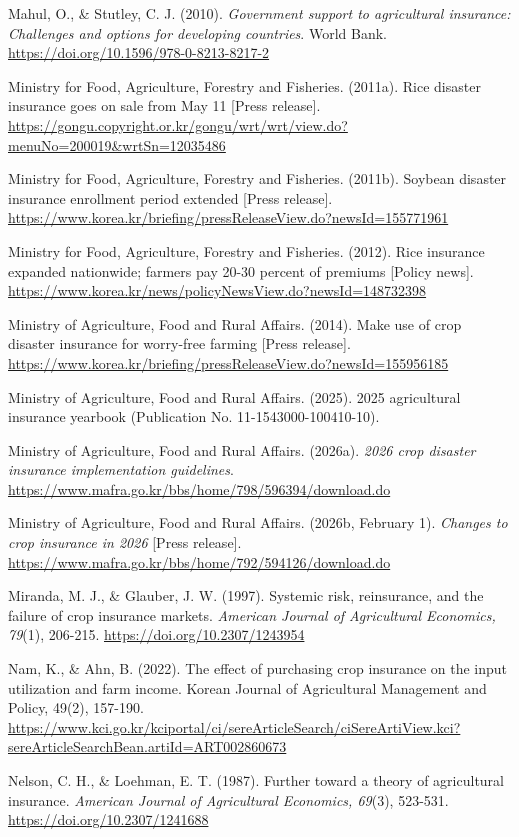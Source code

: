 \begin{wordreferences}
Mahul, O., \& Stutley, C. J. (2010). \emph{Government support to agricultural insurance: Challenges and options for developing countries}. World Bank. \url{https://doi.org/10.1596/978-0-8213-8217-2}

Ministry for Food, Agriculture, Forestry and Fisheries. (2011a). Rice disaster insurance goes on sale from May 11 [Press release]. \url{https://gongu.copyright.or.kr/gongu/wrt/wrt/view.do?menuNo=200019&wrtSn=12035486}

Ministry for Food, Agriculture, Forestry and Fisheries. (2011b). Soybean disaster insurance enrollment period extended [Press release]. \url{https://www.korea.kr/briefing/pressReleaseView.do?newsId=155771961}

Ministry for Food, Agriculture, Forestry and Fisheries. (2012). Rice insurance expanded nationwide; farmers pay 20-30 percent of premiums [Policy news]. \url{https://www.korea.kr/news/policyNewsView.do?newsId=148732398}

Ministry of Agriculture, Food and Rural Affairs. (2014). Make use of crop disaster insurance for worry-free farming [Press release]. \url{https://www.korea.kr/briefing/pressReleaseView.do?newsId=155956185}

Ministry of Agriculture, Food and Rural Affairs. (2025). 2025 agricultural insurance yearbook (Publication No. 11-1543000-100410-10).

Ministry of Agriculture, Food and Rural Affairs. (2026a). \emph{2026 crop disaster insurance implementation guidelines}. \url{https://www.mafra.go.kr/bbs/home/798/596394/download.do}

Ministry of Agriculture, Food and Rural Affairs. (2026b, February 1). \emph{Changes to crop insurance in 2026} [Press release]. \url{https://www.mafra.go.kr/bbs/home/792/594126/download.do}

Miranda, M. J., \& Glauber, J. W. (1997). Systemic risk, reinsurance, and the failure of crop insurance markets. \emph{American Journal of Agricultural Economics, 79}(1), 206-215. \url{https://doi.org/10.2307/1243954}

Nam, K., \& Ahn, B. (2022). The effect of purchasing crop insurance on the input utilization and farm income. Korean Journal of Agricultural Management and Policy, 49(2), 157-190. \url{https://www.kci.go.kr/kciportal/ci/sereArticleSearch/ciSereArtiView.kci?sereArticleSearchBean.artiId=ART002860673}

Nelson, C. H., \& Loehman, E. T. (1987). Further toward a theory of agricultural insurance. \emph{American Journal of Agricultural Economics, 69}(3), 523-531. \url{https://doi.org/10.2307/1241688}


\end{wordreferences}
